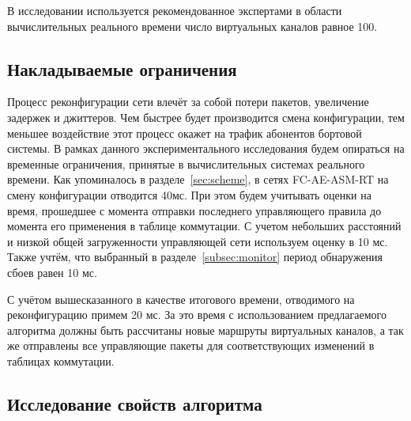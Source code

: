 \documentclass[12pt, a4paper]{article}
\begin{document}
В исследовании используется рекомендованное экспертами в области вычислительных реального времени число виртуальных каналов равное 100.
\FloatBarrier

\subsection{Накладываемые ограничения} \label{subsec:limits}
Процесс реконфигурации сети влечёт за собой потери пакетов, увеличение задержек и джиттеров. Чем быстрее будет производится смена конфигурации, тем меньшее воздействие этот процесс окажет на трафик абонентов бортовой системы. В рамках данного экспериментального исследования будем опираться на временные ограничения, принятые в вычислительных системах реального времени. Как упоминалось в разделе~\ref{sec:scheme}, в сетях FC-AE-ASM-RT на смену конфигурации отводится 40мс. При этом будем учитывать оценки на время, прошедшее с момента отправки последнего управляющего правила до момента его применения в таблице коммутации. С учетом небольших расстояний и низкой общей загруженности управляющей сети используем оценку в 10 мс. Также учтём, что выбранный в разделе~\ref{subsec:monitor} период обнаружения сбоев равен 10 мс.

С учётом вышесказанного в качестве итогового времени, отводимого на реконфигурацию примем 20 мс. За это время с использованием предлагаемого алгоритма должны быть рассчитаны новые маршруты виртуальных каналов, а так же отправлены все управляющие пакеты для соответствующих изменений в таблицах коммутации.

\subsection{Исследование свойств алгоритма}
\end{document}
